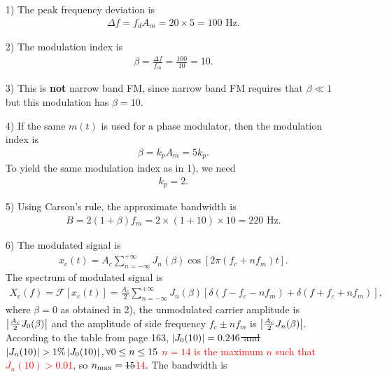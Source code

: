 \documentclass{assignment}
\begin{document}
\begin{sol}
    \begin{itemize}
        \item[1)] The peak frequency deviation is
        \begin{align}
            \Delta f=f_dA_m=20\times 5=100\text{ Hz}.
        \end{align}
        \item[2)] The modulation index is
        \begin{align}
            \beta=\frac{\Delta f}{f_m}=\frac{100}{10}=10.
        \end{align}
        \item[3)] This is \textbf{not} narrow band FM, since narrow band FM requires that $\beta\ll 1$ but this modulation has $\beta=10$.
        \item[4)] If the same $m(t)$ is used for a phase modulator, then the modulation index is
        \begin{align}
            \beta=k_pA_m=5k_p.
        \end{align}
        To yield the same modulation index as in 1), we need
        \begin{align}
            k_p=2.
        \end{align}
        \item[5)] Using Carson's rule, the approximate bandwidth is
        \begin{align}
            B=2(1+\beta)f_m=2\times(1+10)\times 10=220\text{ Hz}.
        \end{align}
        \item[6)] The modulated signal is
        \begin{align}
            x_c(t)=A_c\sum_{n=-\infty}^{+\infty}J_n(\beta)\cos[2\pi(f_c+nf_m)t].
        \end{align}
        The spectrum of modulated signal is
        \begin{align}
            X_c(f)=\mathscr{F}[x_c(t)]=\frac{A_c}{2}\sum_{n=-\infty}^{+\infty}J_n(\beta)\left[\delta(f-f_c-nf_m)+\delta(f+f_c+nf_m)\right],
        \end{align}
        where $\beta=0$ as obtained in 2), the unmodulated carrier amplitude is $\left\lvert\frac{A_c}{2}J_0(\beta)\right\rvert$ and the amplitude of side frequency $f_c\pm nf_m$ is $\left\lvert\frac{A_c}{2}J_n(\beta)\right\rvert$. According to the table from page 163, \sout{$\left\lvert J_0(10)\right\rvert=0.246$ and $\left\lvert J_n(10)\right\rvert>1\%\left\lvert J_0(10)\right\rvert,\forall 0\leq n\leq 15$} \textcolor{red}{$n=14$ is the maximum $n$ such that $J_n(10)>0.01$}, so $n_{\max}=\text{\sout{$15$}}$\textcolor{red}{$14$}. The bandwidth is

\end{itemize}
\end{sol}
\end{document}
